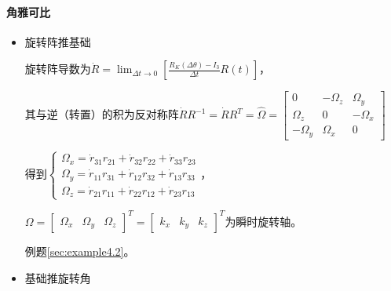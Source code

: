 \documentclass[
12pt, %
a4paper, 
oneside, %
headinclude,footinclude, %
]{scrartcl}
\begin{document}
\paragraph{角雅可比}
\begin{itemize}
\item 旋转阵推基础\label{sec:Rotation_matrix}

旋转阵导数为$ \dot{R} = \lim_{\Delta t \to 0}[\frac{R_K(\Delta \theta) - I_3}{\Delta t} R(t)] $，

其与逆（转置）的积为反对称阵$ \dot{R} R^{-1} = \dot{R} R^T = \hat{\Omega} = \begin{bmatrix} 0 & -\Omega_z & \Omega_y \\ \Omega_z & 0 & -\Omega_x \\ -\Omega_y & \Omega_x & 0 \end{bmatrix} $

得到$ \begin{cases} \Omega_x = \dot{r}_{31} r_{21} + \dot{r}_{32} r_{22} + \dot{r}_{33} r_{23} \\ \Omega_y = \dot{r}_{11} r_{31} + \dot{r}_{12} r_{32} + \dot{r}_{13} r_{33} \\ \Omega_z = \dot{r}_{21} r_{11} + \dot{r}_{22} r_{12} + \dot{r}_{23} r_{13} \end{cases} $，

$ \Omega = \begin{bmatrix} \Omega_x & \Omega_y & \Omega_z \end{bmatrix}^T = \begin{bmatrix} k_x & k_y & k_z \end{bmatrix}^T $为瞬时旋转轴。

例题\ref{sec:example4.2}。
\item 基础推旋转角


\end{itemize}
\end{document}
